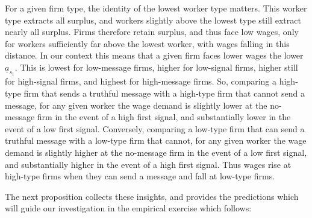 \documentclass[12pt]{article}
\begin{document}
\bigskip

For a given firm type, the identity of the lowest worker type matters. This worker type extracts all surplus, and workers slightly above the lowest type still extract nearly all surplus. Firms therefore retain surplus, and thus face low wages, only for workers sufficiently far above the lowest worker, with wages falling in this distance. In our context this means that a given firm faces lower wages the lower $\underline{a}_{s_{1}}$. This is lowest for low-message firms, higher for low-signal firms, higher still for high-signal firms, and highest for high-message firms. So, comparing a high-type firm that sends a truthful message with a high-type firm that cannot send a message, for any given worker the wage demand is slightly lower at the no-message firm in the event of a high first signal, and substantially lower in the event of a low first signal. Conversely, comparing a low-type firm that can send a truthful message with a low-type firm that cannot, for any given worker the wage demand is slightly higher at the no-message firm in the event of a low first signal, and substantially higher in the event of a high first signal. Thus wages rise at high-type firms when they can send a message and fall at low-type firms.

The next proposition collects these insights, and provides the predictions which will guide our investigation in the empirical exercise which follows:
\end{document}
